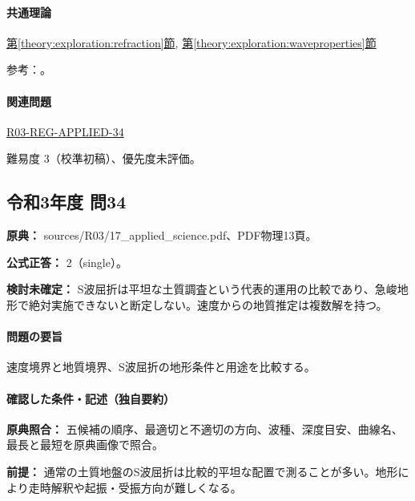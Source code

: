 \paragraph{共通理論} \hyperref[theory:exploration:refraction]{第\ref*{theory:exploration:refraction}節}, \hyperref[theory:exploration:waveproperties]{第\ref*{theory:exploration:waveproperties}節}

\par 参考：\cite{usgs_refraction2013,segj_integrated2017}。

\paragraph{関連問題} \hyperref[q:r03-reg-applied-34]{R03-REG-APPLIED-34}

\par 難易度 3（校準初稿）、優先度未評価。

\subsection{令和3年度 問34}
\label{q:r03-reg-applied-34}

\noindent\textbf{原典：} sources/R03/17\_applied\_science.pdf、PDF物理13頁。

\textbf{公式正答：} 2（single）。

\par\textbf{検討未確定：} S波屈折は平坦な土質調査という代表的運用の比較であり、急峻地形で絶対実施できないと断定しない。速度からの地質推定は複数解を持つ。

\paragraph{問題の要旨} 速度境界と地質境界、S波屈折の地形条件と用途を比較する。

\paragraph{確認した条件・記述（独自要約）}\mbox{}\par

\noindent\textbf{原典照合：} 五候補の順序、最適切と不適切の方向、波種、深度目安、曲線名、最長と最短を原典画像で照合。\par

\noindent\textbf{前提：} 通常の土質地盤のS波屈折は比較的平坦な配置で測ることが多い。地形により走時解釈や起振・受振方向が難しくなる。\par

